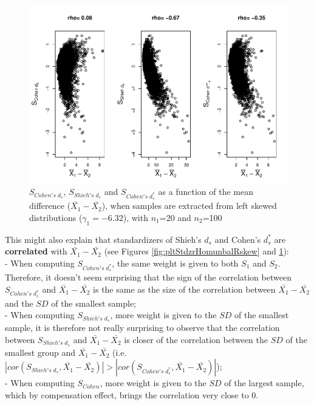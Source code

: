 \documentclass[
  english,
  man]{apa6}
\begin{document}
\begin{figure}
\centering
\includegraphics{Correlation_files/figure-latex/pltStdzrHomunbalLskew-1.pdf}
\caption{\label{fig:pltStdzrHomunbalLskew}\(S_{Cohen's \; d_s}\), \(S_{Shieh's \; d_s}\) and \(S_{Cohen's \; d^*_s}\) as a function of the mean difference (\(\bar{X_1}-\bar{X_2}\)), when samples are extracted from left skewed distributions (\(\gamma_1 = -6.32\)), with \(n_1\)=20 and \(n_2\)=100}
\end{figure}

This might also explain that standardizers of Shieh's \(d_s\) and Cohen's \(d^*_s\) are \textbf{correlated} with \(\bar{X_1}-\bar{X_2}\) (see Figures \ref{fig:pltStdzrHomunbalRskew} and \ref{fig:pltStdzrHomunbalLskew}):\\
- When computing \(S_{Cohen's \; d^*_s}\), the same weight is given to both \(S_1\) and \(S_2\). Therefore, it doesn't seem surprising that the sign of the correlation between \(S_{Cohen's \; d^*_s}\) and \(\bar{X_1}-\bar{X_2}\) is the same as the size of the correlation between \(\bar{X_1}-\bar{X_2}\) and the \(SD\) of the smallest sample;\\
- When computing \(S_{Shieh's \; d_s}\), more weight is given to the \(SD\) of the smallest sample, it is therefore not really surprising to observe that the correlation between \(S_{Shieh's \; d_s}\) and \(\bar{X_1}-\bar{X_2}\) is closer of the correlation between the \(SD\) of the smallest group and \(\bar{X_1}-\bar{X_2}\) (i.e.~\(|cor(S_{Shieh's \; d_s},\bar{X_1}-\bar{X_2})| > |cor(S_{Cohen's \; d^*_s},\bar{X_1}-\bar{X_2})|\));\\
- When computing \(S_{Cohen}\), more weight is given to the \(SD\) of the largest sample, which by compensation effect, brings the correlation very close to 0.
\end{document}
